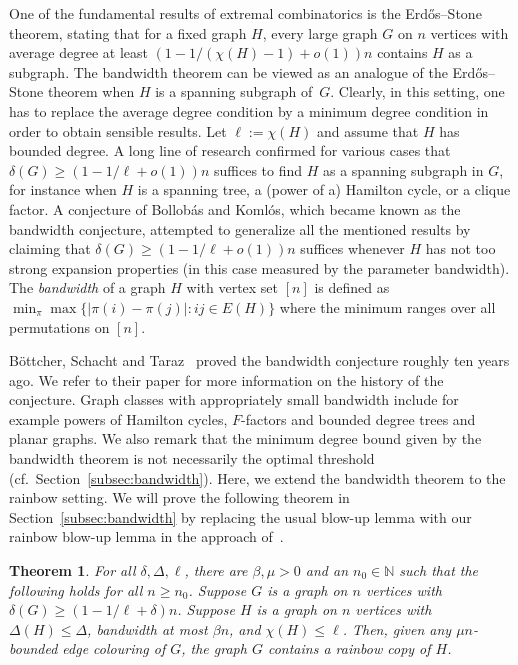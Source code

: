 \documentclass[10pt]{amsart}
\newtheorem{theorem}[algorithm]{Theorem}
\theoremstyle{definition}
\theoremstyle{claimstyle}
\theoremstyle{stepstyle}
\numberwithin{equation}{section}
\begin{document}
One of the fundamental results of extremal combinatorics is the Erd\H{o}s--Stone theorem, stating that for a fixed graph $H$, every large graph $G$ on $n$ vertices with average degree at least $(1-1/(\chi(H)-1)+o(1))n$ contains $H$ as a subgraph.
The bandwidth theorem can be viewed as an analogue of the Erd\H{o}s--Stone theorem when $H$ is a spanning subgraph of~$G$. Clearly, in this setting, one has to replace the average degree condition by a minimum degree condition in order to obtain sensible results. 
Let $\ell:=\chi(H)$ and assume that $H$ has bounded degree.
A long line of research confirmed for various cases that $\delta(G)\geq (1-1/\ell+o(1))n$ suffices to find $H$ as a spanning subgraph in $G$, for instance when $H$ is a spanning tree, a (power of a) Hamilton cycle, or a clique factor.
A conjecture of Bollob\'as and Koml\'os, which became known as the bandwidth conjecture, attempted to
generalize all the mentioned results by claiming that $\delta(G)\geq (1-1/\ell+o(1))n$ suffices whenever $H$ has not too strong expansion properties (in this case measured by the parameter bandwidth). The \emph{bandwidth} of a graph $H$ with vertex set $[n]$ is defined as
$\min_{\pi}\max \{|\pi(i)-\pi(j)|\colon ij\in E(H)\}$ where the minimum ranges over all permutations on $[n]$.

B\"ottcher, Schacht and Taraz~\cite{BST:09} proved the bandwidth conjecture roughly ten years ago. We refer to their paper for more information on the history of the conjecture. Graph classes with appropriately small bandwidth include for example powers of Hamilton cycles, $F$-factors and bounded degree trees and planar graphs. We also remark that the minimum degree bound given by the bandwidth theorem is not necessarily the optimal threshold (cf.~Section~\ref{subsec:bandwidth}). 
Here, we extend the bandwidth theorem to the rainbow setting. 
We will prove the following theorem in Section~\ref{subsec:bandwidth} 
by replacing the usual blow-up lemma with our rainbow blow-up lemma in the approach of~\cite{BST:09}.



\begin{theorem}\label{thm:bandwsimple}
For all $\delta,\Delta,\ell$,
there are $\beta,\mu>0$ and an $n_0\in \mathbb{N}$
such that the following holds for all $n\geq n_0$.
Suppose $G$ is a graph on $n$ vertices with $\delta(G)\geq (1-1/\ell+\delta)n$.
Suppose $H$ is a graph on $n$ vertices with $\Delta(H)\leq \Delta$, bandwidth at most $\beta n$, and $\chi(H)\le \ell$.
Then, given any $\mu n$-bounded edge colouring of $G$, the graph $G$ contains a rainbow copy of $H$.
\end{theorem}
\end{document}
